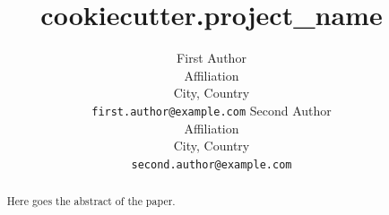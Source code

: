 \documentclass{article}
\title{
  {{cookiecutter.project_name}}
}
\author{
  First Author \\
  Affiliation \\
  City, Country \\
  \texttt{first.author@example.com}
  \And
  Second Author \\
  Affiliation \\
  City, Country \\
  \texttt{second.author@example.com}
}
\begin{document}
\maketitle

\begin{abstract}
  Here goes the abstract of the paper.
\end{abstract}





\end{document}
